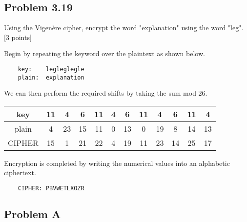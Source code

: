 \documentclass[../hw_sols.tex]{subfiles}
\begin{document}
\newpage



\subsection*{Problem 3.19}

Using the Vigenère cipher, encrypt the word "explanation" using the word 
"leg". [3 points]

\begin{solution}

Begin by repeating the keyword over the plaintext as shown below.
\begin{verbatim}
    key:    legleglegle
    plain:  explanation
\end{verbatim}

We can then perform the required shifts by taking the sum mod 26.
	\begin{center}
	\begin{tabular}{ *{12}{| c } | }
		\hline
		   key & 11 &  4 &  6 & 11 & 4 &  6 & 11 &  4 &  6 & 11 &  4 \\
		\hline
		 plain &  4 & 23 & 15 & 11 & 0 & 13 &  0 & 19 &  8 & 14 & 13 \\
		\hline
		CIPHER & 15 &  1 & 21 & 22 & 4 & 19 & 11 & 23 & 14 & 25 & 17 \\
		\hline
	\end{tabular}
	\end{center}

Encryption is completed by writing the numerical values into an alphabetic 
ciphertext.
\begin{verbatim}
    CIPHER: PBVWETLXOZR
\end{verbatim}

\end{solution}


\newpage



\subsection*{Problem A}
\end{document}
